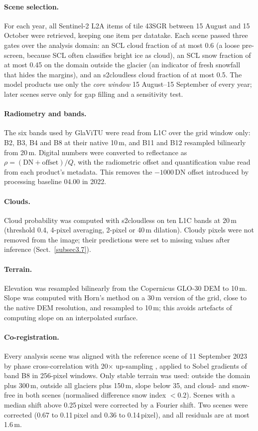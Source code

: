 \documentclass[pdflatex,sn-mathphys-num]{sn-jnl}%
\theoremstyle{thmstyleone}%
\theoremstyle{thmstyletwo}%
\theoremstyle{thmstylethree}%
\begin{document}
\paragraph{Scene selection.} For each year, all Sentinel-2 L2A items of tile 43SGR between 15 August and 15 October were retrieved, keeping one item per datatake. Each scene passed three gates over the analysis domain: an SCL cloud fraction of at most 0.6 (a loose pre-screen, because SCL often classifies bright ice as cloud), an SCL snow fraction of at most 0.45 on the domain outside the glacier (an indicator of fresh snowfall that hides the margins), and an s2cloudless \cite{skakun2022} cloud fraction of at most 0.5. The model products use only the \emph{core window} 15 August--15 September of every year; later scenes serve only for gap filling and a sensitivity test.

\paragraph{Radiometry and bands.} The six bands used by GlaViTU were read from L1C over the grid window only: B2, B3, B4 and B8 at their native 10\,m, and B11 and B12 resampled bilinearly from 20\,m. Digital numbers were converted to reflectance as $\rho = (\mathrm{DN} + \mathrm{offset})/Q$, with the radiometric offset and quantification value read from each product's metadata. This removes the $-1000$\,DN offset introduced by processing baseline 04.00 in 2022.

\paragraph{Clouds.} Cloud probability was computed with s2cloudless on ten L1C bands at 20\,m (threshold 0.4, 4-pixel averaging, 2-pixel or 40\,m dilation). Cloudy pixels were not removed from the image; their predictions were set to missing values after inference (Sect.~\ref{subsec3.7}).

\paragraph{Terrain.} Elevation was resampled bilinearly from the Copernicus GLO-30 DEM to 10\,m. Slope was computed with Horn's method \cite{horn1981} on a 30\,m version of the grid, close to the native DEM resolution, and resampled to 10\,m; this avoids artefacts of computing slope on an interpolated surface.

\paragraph{Co-registration.} Every analysis scene was aligned with the reference scene of 11 September 2023 by phase cross-correlation with 20$\times$ up-sampling \cite{guizar2008}, applied to Sobel gradients of band B8 in 256-pixel windows. Only stable terrain was used: outside the domain plus 300\,m, outside all glaciers plus 150\,m, slope below 35\textdegree, and cloud- and snow-free in both scenes (normalised difference snow index $<0.2$). Scenes with a median shift above 0.25\,pixel were corrected by a Fourier shift. Two scenes were corrected (0.67 to 0.11\,pixel and 0.36 to 0.14\,pixel), and all residuals are at most 1.6\,m.
\end{document}
